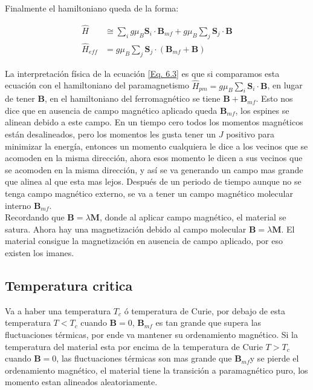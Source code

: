 \documentclass[11pt,fleqn]{book}
\renewcommand{\vec}[1]{\mathbf{#1}}
\begin{document}
Finalmente el hamiltoniano queda de la forma:

\begin{equation}
\begin{split}
       \hat{H}&\cong\sum_{i}g\mu_{B}\vec{S}_{i}\cdot\vec{B}_{mf}+g\mu_{B}\sum_{j}\vec{S}_{j}\cdot\vec{B}\\
       \hat{H}_{eff}&=g\mu_{B}\sum_{j}\vec{S}_{j}\cdot(\vec{B}_{mf}+\vec{B})
\end{split}
\label{Eq. 6.3}
\end{equation}

La interpretación física de la ecuación \ref{Eq. 6.3} es que si comparamos esta ecuación con el hamiltoniano del paramagnetismo  $\hat{H}_{pm}=g\mu_{B}\sum_{i}\vec{S}_{i}\cdot\vec{B}$, en lugar de  tener $\vec{B}$, en el hamiltoniano del ferromagnético se tiene $\vec{B}+\vec{B}_{mf}$. Esto nos dice que en ausencia de campo magnético aplicado queda $\vec{B}_{mf}$, los espines se alinean debido a este campo. En un tiempo cero todos los momentos magnéticos están desalineados, pero los momentos les gusta tener un $J$ positivo para minimizar la energía, entonces un momento cualquiera le dice a los vecinos que se acomoden en la misma dirección, ahora esos momento le dicen a sus vecinos que se acomoden en la misma dirección, y así se va generando un campo mas grande que alinea al que esta mas lejos. Después de un periodo de tiempo aunque no se tenga campo magnético externo, se va a tener un campo magnético molecular interno  $\vec{B}_{mf}$. \\

Recordando que $\vec{B}=\lambda\vec{M}$, donde al aplicar campo magnético, el material se satura. Ahora hay una magnetización debido al campo molecular $\vec{B}=\lambda\vec{M}$. El material consigue la magnetización en ausencia de campo aplicado, por eso existen los imanes. 

\subsection{Temperatura critica}

Va a haber una temperatura $T_{c}$ ó temperatura de Curie, por debajo de esta temperatura $T<T_{c}$ cuando $\vec{B}=0$, $\vec{B}_{mf}$ es tan grande que supera las fluctuaciones térmicas, por ende va mantener su ordenamiento magnético. Si la temperatura del material esta por encima de la temperatura de Curie $T>T_{c}$ cuando $\vec{B}=0$, las fluctuaciones térmicas son mas grande que $\vec{B}_{mf}$y se pierde el ordenamiento magnético, el material tiene  la transición a paramagnético puro, los momento estan alineados aleatoriamente.
\end{document}
